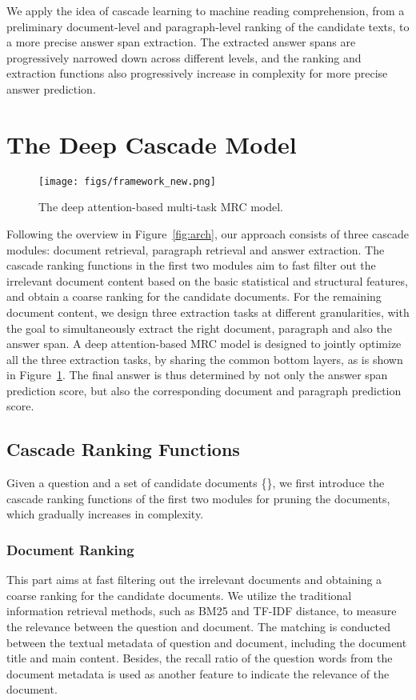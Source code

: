 \documentclass[letterpaper]{article} \usepackage{aaai19}  \usepackage{graphicx}
\begin{document}
We apply the idea of cascade learning to machine reading comprehension, from a preliminary document-level and paragraph-level ranking of the candidate texts, to a more precise answer span extraction. The extracted answer spans are progressively narrowed down across different levels, and the ranking and extraction functions also progressively increase in complexity for more precise answer prediction. 

\section{The Deep Cascade Model}

\begin{figure}
\centering
\texttt{[image: figs/framework\_new.png]}\vspace{-2mm}
\caption{The deep attention-based multi-task MRC model.}\vspace{-3mm}
\label{fig:cascade}
\end{figure}

Following the overview in Figure~\ref{fig:arch}, our approach consists of three cascade modules: document retrieval, paragraph retrieval and answer extraction. The cascade ranking functions in the first two modules aim to fast filter out the irrelevant document content based on the basic statistical and structural features, and obtain a coarse ranking for the candidate documents. For the remaining document content, we design three extraction tasks at different granularities, with the goal to simultaneously extract the right document, paragraph and also the answer span. A deep attention-based MRC model is designed to jointly optimize all the three extraction tasks, by sharing the common bottom layers, as is shown in Figure~\ref{fig:cascade}. The final answer is thus determined by not only the answer span prediction score, but also the corresponding document and paragraph prediction score. 

\subsection{Cascade Ranking Functions}
Given a question  and a set of candidate documents \{\}, we first introduce the cascade ranking functions of the first two modules for pruning the documents, which gradually increases in complexity.  

\subsubsection{Document Ranking}
This part aims at fast filtering out the irrelevant documents and obtaining a coarse ranking for the candidate documents. We utilize the traditional information retrieval methods, such as BM25 and TF-IDF distance, to measure the relevance between the question and document. The matching is conducted between the textual metadata of question and document, including the document title and main content. Besides, the recall ratio of the question words from the document metadata is used as another feature to indicate the relevance of the document. 
\end{document}
